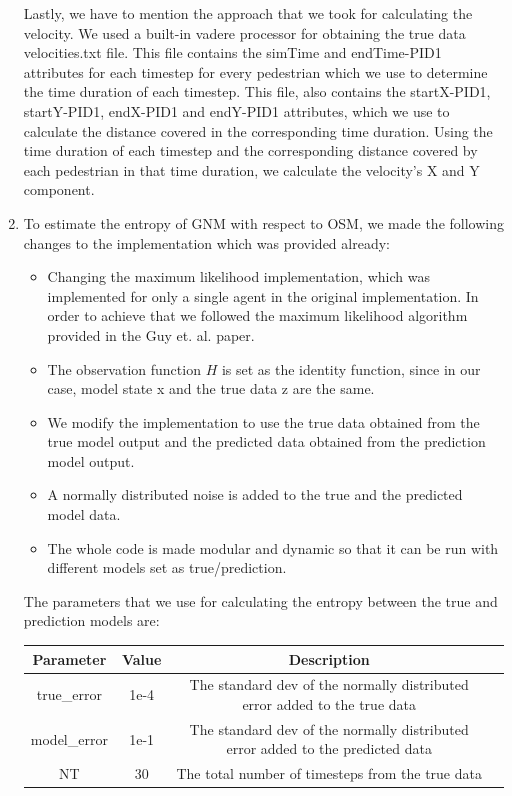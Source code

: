 \documentclass[10pt,a4paper]{article}
\begin{document}
\begin{enumerate}
	Lastly, we have to mention the approach that we took for calculating the velocity. We used a built-in vadere processor for obtaining the true data velocities.txt file. This file contains the simTime and endTime-PID1 attributes for each timestep for every pedestrian which we use to determine the time duration of each timestep. This file, also contains the startX-PID1, startY-PID1, endX-PID1 and endY-PID1 attributes, which we use to calculate the distance covered in the corresponding time duration. Using the time duration of each timestep and the corresponding distance covered by each pedestrian in that time duration, we calculate the velocity's X and Y component. 
	\item To estimate the entropy of GNM with respect to OSM, we made the following changes to the implementation which was provided already:
	\begin{itemize}
		\item Changing the maximum likelihood implementation, which was implemented for only a single agent in the original implementation. In order to achieve that we followed the maximum likelihood algorithm provided in the Guy et. al. paper. 
		\item The observation function $H$ is set as the identity function, since in our case, model state x and the true data z are the same.
		\item We modify the implementation to use the true data obtained from the true model output and the predicted data obtained from the prediction model output.
		\item A normally distributed noise is added to the true and the predicted model data.
		\item The whole code is made modular and dynamic so that it can be run with different models set as true/prediction. 
	\end{itemize}
	The parameters that we use for calculating the entropy between the true and prediction models are:
	 \begin{center}
	\begin{tabular}{ |c|c|c|c| } 
	\hline
	Parameter & Value & Description \\
	\hline\hline
	true\_error & 1e-4 & The standard dev of the normally distributed error added to the true data \\ 
	model\_error & 1e-1 & The standard dev of the normally distributed error added to the predicted data \\ 
	NT & 30 & The total number of timesteps from the true data \\ 

\end{tabular}
\end{center}
\end{enumerate}
\end{document}
